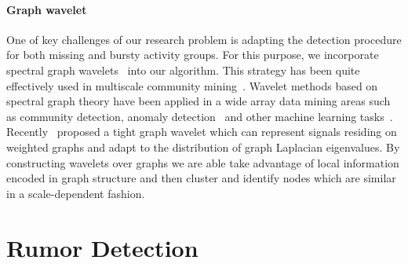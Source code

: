 \paragraph{Graph wavelet}
One of key challenges of our research problem is adapting the detection procedure for both missing and bursty activity groups. For this purpose, we incorporate spectral graph wavelets~\cite{hammond2011wavelets} into our algorithm. This strategy has been quite effectively used in multiscale community mining~\cite{tremblay2014graph}.
Wavelet methods based on spectral graph theory have been applied in a wide array data mining areas such as community detection, anomaly detection~\cite{calderara2011detecting} and other machine learning tasks~\cite{shuman_ACHA_2013,ghosh2003wavelet,rustamov2013wavelets,2000wavecluster}. Recently~\cite{shuman2015spectrum} proposed a tight graph wavelet which can represent signals residing on weighted graphs and adapt to the distribution of graph Laplacian eigenvalues.
By constructing wavelets over graphs we are able take advantage of local information encoded in graph structure and then cluster and identify nodes which are similar in a scale-dependent fashion.



\section{Rumor Detection}


